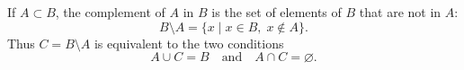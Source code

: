 If $A \subset B$, the complement of $A$ in $B$ is the set of elements of $B$ that are not in $A$:
$$B \setminus A = \{x \mid x \in B,\; x \notin A\}.$$
Thus $C = B \setminus A$ is equivalent to the two conditions
$$A \cup C = B \quad \text{and} \quad A \cap C = \varnothing.$$
